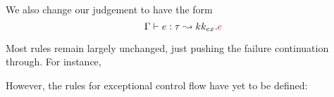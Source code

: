 \documentclass{article}
\newcommand{\iin}{\text{ \texttt{in} }}
\newcommand{\llet}{\text{\texttt{let} }}
\newcommand{\src}[1]{{\color{purple}#1}}
\begin{document}
We also change our judgement to have the form
\[
\Gamma\vdash e : \tau \leadsto k k_{ex} . \src{e}
\]

Most rules remain largely unchanged, just pushing the failure continuation
through. For instance,


However, the rules for exceptional control flow have yet to be defined:
\end{document}
